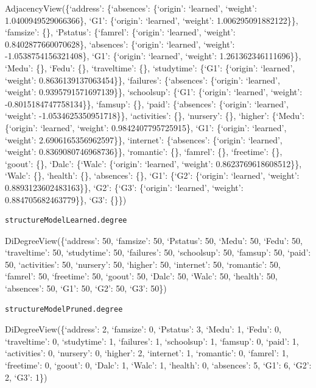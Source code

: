 \documentclass[
]{article}
\begin{document}
AdjacencyView(\{`address': \{`absences': \{`origin': `learned',
`weight': 1.0400949529066366\}, `G1': \{`origin': `learned', `weight':
1.006295091882122\}\}, `famsize': \{\}, `Pstatus': \{`famrel':
\{`origin': `learned', `weight': 0.8402877660070628\}, `absences':
\{`origin': `learned', `weight': -1.0538754156321408\}, `G1':
\{`origin': `learned', `weight': 1.261362346111696\}\}, `Medu': \{\},
`Fedu': \{\}, `traveltime': \{\}, `studytime': \{`G1': \{`origin':
`learned', `weight': 0.8636139137063454\}\}, `failures': \{`absences':
\{`origin': `learned', `weight': 0.9395791571697139\}\}, `schoolsup':
\{`G1': \{`origin': `learned', `weight': -0.8015184747758134\}\},
`famsup': \{\}, `paid': \{`absences': \{`origin': `learned', `weight':
-1.0534625350951718\}\}, `activities': \{\}, `nursery': \{\}, `higher':
\{`Medu': \{`origin': `learned', `weight': 0.9842407795725915\}, `G1':
\{`origin': `learned', `weight': 2.6906165356962597\}\}, `internet':
\{`absences': \{`origin': `learned', `weight': 0.8369080746968736\}\},
`romantic': \{\}, `famrel': \{\}, `freetime': \{\}, `goout': \{\},
`Dalc': \{`Walc': \{`origin': `learned', `weight':
0.8623769618608512\}\}, `Walc': \{\}, `health': \{\}, `absences': \{\},
`G1': \{`G2': \{`origin': `learned', `weight': 0.8893123602483163\}\},
`G2': \{`G3': \{`origin': `learned', `weight': 0.884705682463779\}\},
`G3': \{\}\})

\begin{verbatim}
structureModelLearned.degree
\end{verbatim}

DiDegreeView(\{`address': 50, `famsize': 50, `Pstatus': 50, `Medu': 50,
`Fedu': 50, `traveltime': 50, `studytime': 50, `failures': 50,
`schoolsup': 50, `famsup': 50, `paid': 50, `activities': 50, `nursery':
50, `higher': 50, `internet': 50, `romantic': 50, `famrel': 50,
`freetime': 50, `goout': 50, `Dalc': 50, `Walc': 50, `health': 50,
`absences': 50, `G1': 50, `G2': 50, `G3': 50\})

\begin{verbatim}
structureModelPruned.degree
\end{verbatim}

DiDegreeView(\{`address': 2, `famsize': 0, `Pstatus': 3, `Medu': 1,
`Fedu': 0, `traveltime': 0, `studytime': 1, `failures': 1, `schoolsup':
1, `famsup': 0, `paid': 1, `activities': 0, `nursery': 0, `higher': 2,
`internet': 1, `romantic': 0, `famrel': 1, `freetime': 0, `goout': 0,
`Dalc': 1, `Walc': 1, `health': 0, `absences': 5, `G1': 6, `G2': 2,
`G3': 1\})
\end{document}
